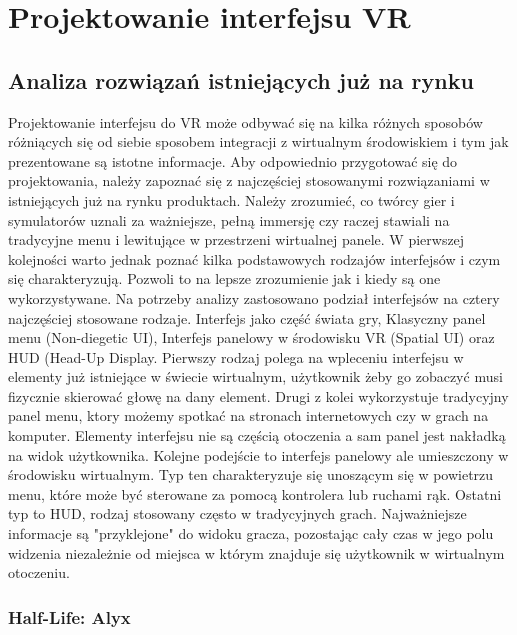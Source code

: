\chapter{Projektowanie interfejsu VR}


\section{Analiza rozwiązań istniejących już na rynku}
Projektowanie interfejsu do VR może odbywać się na kilka różnych sposobów różniących się od siebie sposobem integracji z wirtualnym środowiskiem i tym jak prezentowane są istotne informacje. Aby odpowiednio przygotować się do projektowania, należy zapoznać się z najczęściej stosowanymi rozwiązaniami w istniejących już na rynku produktach. Należy zrozumieć, co twórcy gier i symulatorów uznali za ważniejsze, pełną immersję czy raczej stawiali na tradycyjne menu i lewitujące w przestrzeni wirtualnej panele. W pierwszej kolejności warto jednak poznać kilka podstawowych rodzajów interfejsów i czym się charakteryzują. Pozwoli to na lepsze zrozumienie jak i kiedy są one wykorzystywane. Na potrzeby analizy zastosowano podział interfejsów na cztery najczęściej stosowane rodzaje. Interfejs jako część świata gry, Klasyczny panel menu (Non-diegetic UI), Interfejs panelowy w środowisku VR (Spatial UI) oraz HUD (Head-Up Display.
Pierwszy rodzaj polega na wpleceniu interfejsu w elementy już istniejące w świecie wirtualnym, użytkownik żeby go zobaczyć musi fizycznie skierować głowę na dany element. Drugi z kolei wykorzystuje tradycyjny panel menu, ktory możemy spotkać na stronach internetowych czy w grach na komputer. Elementy interfejsu nie są częścią otoczenia a sam panel jest nakładką na widok użytkownika. Kolejne podejście to interfejs panelowy ale umieszczony w środowisku wirtualnym. Typ ten charakteryzuje się unoszącym się w powietrzu menu, które może być sterowane za pomocą kontrolera lub ruchami rąk. Ostatni typ to HUD, rodzaj stosowany często w tradycyjnych grach. Najważniejsze informacje są "przyklejone" do widoku gracza, pozostając cały czas w jego polu widzenia niezależnie od miejsca w którym znajduje się użytkownik w wirtualnym otoczeniu.

\subsection{Half-Life: Alyx}




